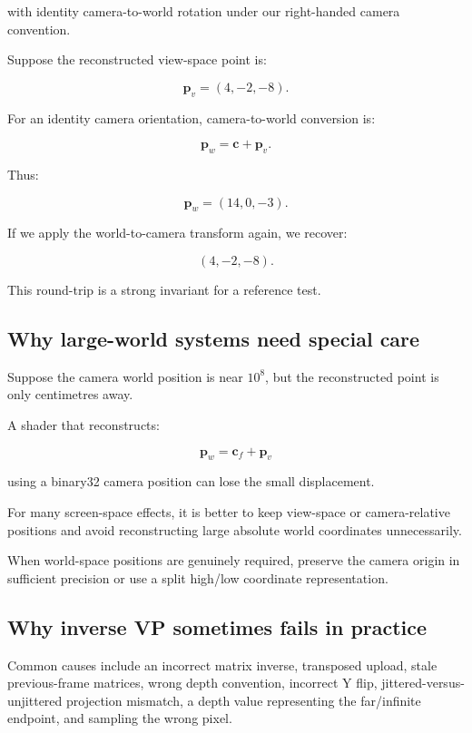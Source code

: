 with identity camera-to-world rotation under our right-handed camera convention.

Suppose the reconstructed view-space point is:

\[ \mathbf p_v=(4,-2,-8). \]

For an identity camera orientation, camera-to-world conversion is:

\[ \mathbf p_w=\mathbf c+\mathbf p_v. \]

Thus:

\[ \boxed{ \mathbf p_w=(14,0,-3). } \]

If we apply the world-to-camera transform again, we recover:

\[ (4,-2,-8). \]

This round-trip is a strong invariant for a reference test.

\subsection{Why large-world systems need special care}\label{02-foundations-ii-ch035-why-large-world-systems-need-special-care}

Suppose the camera world position is near \(10^8\), but the reconstructed point is only centimetres away.

A shader that reconstructs:

\[ \mathbf p_w=\mathbf c_f+\mathbf p_v \]

using a binary32 camera position can lose the small displacement.

For many screen-space effects, it is better to keep view-space or camera-relative positions and avoid reconstructing large absolute world coordinates unnecessarily.

When world-space positions are genuinely required, preserve the camera origin in sufficient precision or use a split high/low coordinate representation.

\subsection{Why inverse VP sometimes fails in practice}\label{02-foundations-ii-ch035-why-inverse-vp-sometimes-fails-in-practice}

Common causes include an incorrect matrix inverse, transposed upload, stale previous-frame matrices, wrong depth convention, incorrect Y flip, jittered-versus-unjittered projection mismatch, a depth value representing the far/infinite endpoint, and sampling the wrong pixel.

